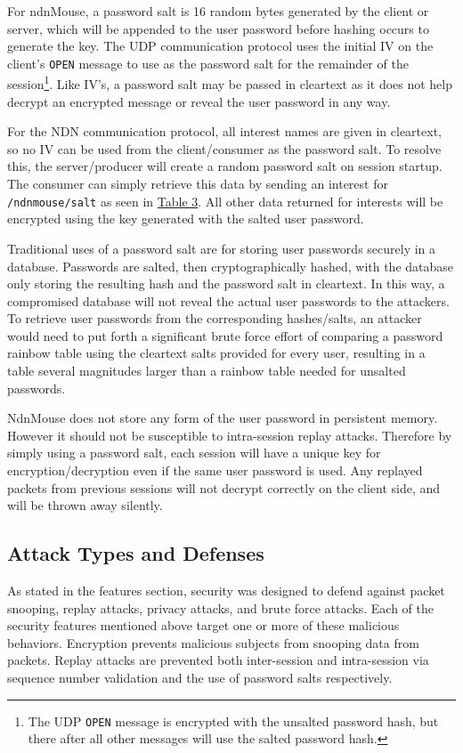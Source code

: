 \documentclass{sig-alternate}
\renewcommand\_{\textunderscore\allowbreak}  %
\begin{document}
For ndnMouse, a password salt is 16 random bytes generated by the client or server, which will be appended to the user password before hashing occurs to generate the key. The UDP communication protocol uses the initial IV on the client's \texttt{OPEN} message to use as the password salt for the remainder of the session\footnote{The UDP \texttt{OPEN} message is encrypted with the unsalted password hash, but there after all other messages will use the salted password hash.}. Like IV's, a password salt may be passed in cleartext as it does not help decrypt an encrypted message or reveal the user password in any way. 

For the NDN communication protocol, all interest names are given in cleartext, so no IV can be used from the client/consumer as the password salt. To resolve this, the server/producer will create a random password salt on session startup. The consumer can simply retrieve this data by sending an interest for \texttt{/ndnmouse/salt} as seen in \hyperlink{tab:ndnInterestNames}{Table 3}. All other data returned for interests will be encrypted using the key generated with the salted user password.

Traditional uses of a password salt are for storing user passwords securely in a database. Passwords are salted, then cryptographically hashed, with the database only storing the resulting hash and the password salt in cleartext. In this way, a compromised database will not reveal the actual user passwords to the attackers. To retrieve user passwords from the corresponding hashes/salts, an attacker would need to put forth a significant brute force effort of comparing a password rainbow table using the cleartext salts provided for every user, resulting in a table several magnitudes larger than a rainbow table needed for unsalted passwords. 

NdnMouse does not store any form of the user password in persistent memory. However it should not be susceptible to intra-session replay attacks. Therefore by simply using a password salt, each session will have a unique key for encryption/decryption even if the same user password is used. Any replayed packets from previous sessions will not decrypt correctly on the client side, and will be thrown away silently.

\subsection{Attack Types and Defenses}
As stated in the features section, security was designed to defend against packet snooping, replay attacks, privacy attacks, and brute force attacks. Each of the security features mentioned above target one or more of these malicious behaviors. Encryption prevents malicious subjects from snooping data from packets. Replay attacks are prevented both inter-session and intra-session via sequence number validation and the use of password salts respectively. 
\end{document}
